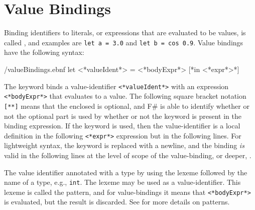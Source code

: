 \section{Value Bindings}
\label{sec:values}
Binding identifiers to literals, or expressions that are evaluated to be values, is called , and examples are \lstinline!let a = 3.0! and \lstinline!let b = cos 0.9!. Value bindings have the following syntax:
%
\begin{verbatimwrite}{\ebnf/valueBindings.ebnf}
let <*valueIdent*> = <*bodyExpr*> [*in <*expr*>*]
\end{verbatimwrite}
%
The  keyword binds a value-identifier \lstinline[language=syntax]{<*valueIdent*>} with an expression \lstinline[language=syntax]{<*bodyExpr*>} that evaluates to a value. The following square bracket notation \lstinline[language=syntax]{[**]} means that the enclosed is optional, and F\# is able to identify whether or not the optional part is used by whether or not the  keyword is present in the binding expression. If the  keyword is used, then the value-identifier is a local definition in the following \lstinline[language=syntax]{<*expr*>} expression but in the following lines. For lightweight syntax, the  keyword is replaced with a newline, and the binding \emph{is} valid in the following lines at the level of scope of the value-binding, or deeper, .

The value identifier annotated with a type by using the \idx[:@\lstinline{:}]{\lexeme{:}} lexeme followed by the name of a type, e.g., \lstinline{int}. The \idx[\_@\lstinline{_}]{\lexeme{\_}} lexeme may be used as a value-identifier. This lexeme is called the  pattern, and for value-bindings it means that \lstinline[language=syntax]{<*bodyExpr*>} is evaluated, but the result is discarded. See  for more details on patterns.

